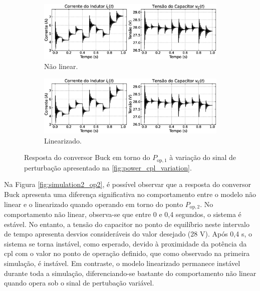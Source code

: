 \begin{figure}[H]
  \centering
  \captionsetup{justification=centering}
  \begin{subfigure}{1.\textwidth}
    \centering
    \includegraphics[width=\linewidth]{figuras/buck/simulation2_op1_nonlinear.eps}
    \caption{Não linear.}
    \label{fig:simulation2_op1_nonlinear}
  \end{subfigure}
  \newline
  \begin{subfigure}{1.\textwidth}
    \centering
    \includegraphics[width=\linewidth]{figuras/buck/simulation2_op1_linear.eps}
    \caption{Linearizado.}
    \label{fig:simulation2_op1_linear}
  \end{subfigure}
  \caption{Resposta do conversor Buck em torno do $P_{\mathrm{op}, 1}$ à variação do sinal de perturbação apresentado na \autoref{fig:power_cpl_variation}.}
  \label{fig:simulation2_op1}
\end{figure}

Na Figura \ref{fig:simulation2_op2}, é possível observar que a resposta do conversor Buck apresenta uma diferença significativa no comportamento entre o modelo não linear e o linearizado quando operando em torno do ponto $P_{\mathrm{op}, 2}$. No comportamento não linear, observa-se que entre 0 e 0,4 segundos, o sistema é estável. No entanto, a tensão do capacitor no ponto de equilíbrio neste intervalo de tempo apresenta desvios consideráveis do valor desejado (28 V). Após 0,4 s, o sistema se torna instável, como esperado, devido à proximidade da potência da \acrshort{cpl} com o valor no ponto de operação definido, que como observado na primeira simulação, é instável. Em contraste, o modelo linearizado permanece instável durante toda a simulação, diferenciando-se bastante do comportamento não linear quando opera sob o sinal de pertubação variável.

